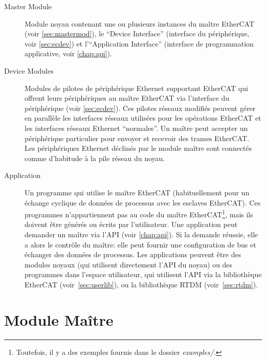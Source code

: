 \documentclass[a4paper,12pt,BCOR6mm,bibtotoc,idxtotoc]{scrbook}
\begin{document}
\begin{description}

\item[Master Module] Module noyau contenant une
  ou plusieurs instances du ma\^itre EtherCAT (voir
  \autoref{sec:mastermod}), le ``Device Interface'' (interface du
  p\'eriph\'erique, voir \autoref{sec:ecdev}) et l'``Application
  Interface'' (interface de programmation applicative, voir
  \autoref{chap:api}).

\item[Device Modules] Modules de pilotes de p\'eriph\'erique Ethernet supportant EtherCAT
  qui offrent leurs p\'eriph\'eriques au ma\^itre EtherCAT via
  l'interface du p\'eriph\'erique (voir \autoref{sec:ecdev}).  Ces
  pilotes r\'eseaux modifi\'es peuvent g\'erer en parall\`ele les
  interfaces r\'eseaux utilis\'ees pour les op\'erations EtherCAT et
  les interfaces r\'eseaux Ethernet ``normales''.  Un ma\^itre peut
  accepter un p\'eriph\'erique particulier pour envoyer et recevoir
  des trames EtherCAT. Les p\'eriph\'eriques Ethernet d\'eclin\'es
  par le module ma\^itre sont connect\'es comme d'habitude \`a la pile
  r\'eseau du noyau.

\item[Application] Un programme qui utilise le
  ma\^itre EtherCAT (habituellement pour un \'echange cyclique de
  donn\'ees de processus avec les esclaves EtherCAT).  Ces programmes
  n'appartiennent pas au code du ma\^itre EtherCAT\footnote{Toutefois,
  il y a des exemples fournis dans le dossier \textit{examples/}.},
  mais ils doivent \^etre g\'en\'er\'es ou \'ecrits par
  l'utilisateur. Une application peut demander un ma\^itre via l'API
  (voir \autoref{chap:api}). Si la demande r\'eussie, elle a alors le
  contr\^ole du ma\^itre: elle peut fournir une configuration de bus
  et \'echanger des donn\'ees de processus. Les applications peuvent
  \^etre des modules noyaux (qui utilisent directement l'API du noyau)
  ou des programmes dans l'espace utilisateur, qui utilisent l'API via
  la biblioth\`eque EtherCAT (voir~\autoref{sec:userlib}), ou la
  biblioth\`eque RTDM (voir~\autoref{sec:rtdm}).

\end{description}


\section{Module Ma\^itre}
\label{sec:mastermod}
\end{document}
